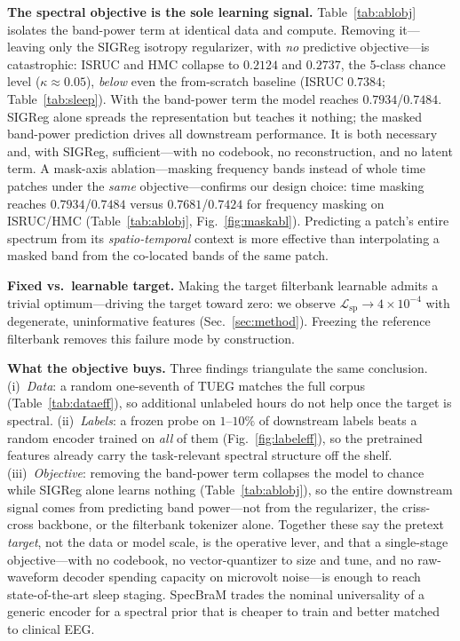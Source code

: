\documentclass[letterpaper]{article} %
\begin{document}
\noindent\textbf{The spectral objective is the sole learning signal.}
Table~\ref{tab:ablobj} isolates the band-power term at identical data and compute.
Removing it---leaving only the SIGReg isotropy regularizer, with \emph{no}
predictive objective---is catastrophic: ISRUC and HMC collapse to $0.2124$ and
$0.2737$, the 5-class chance level ($\kappa{\approx}0.05$), \emph{below} even the
from-scratch baseline (ISRUC $0.7384$; Table~\ref{tab:sleep}). With the band-power
term the model reaches $0.7934$/$0.7484$. SIGReg alone spreads the representation
but teaches it nothing; the masked band-power prediction drives all downstream
performance. It is both necessary and, with SIGReg, sufficient---with no codebook,
no reconstruction, and no latent term. A mask-axis ablation---masking frequency
bands instead of whole time patches under the \emph{same} objective---confirms our
design choice: time masking reaches $0.7934$/$0.7484$ versus $0.7681$/$0.7424$ for
frequency masking on ISRUC/HMC (Table~\ref{tab:ablobj}, Fig.~\ref{fig:maskabl}).
Predicting a patch's entire spectrum from its \emph{spatio-temporal} context is
more effective than interpolating a masked band from the co-located bands of the
same patch.



\noindent\textbf{Fixed vs.\ learnable target.} Making the target filterbank learnable
admits a trivial optimum---driving the target toward zero: we observe
$\mathcal{L}_{\mathrm{sp}}{\to}4{\times}10^{-4}$ with degenerate, uninformative
features (Sec.~\ref{sec:method}). Freezing the reference filterbank removes this
failure mode by construction.

\noindent\textbf{What the objective buys.} Three findings triangulate the same
conclusion. (i)~\emph{Data}: a random one-seventh of TUEG matches the full corpus
(Table~\ref{tab:dataeff}), so additional unlabeled hours do not help once the target
is spectral. (ii)~\emph{Labels}: a frozen probe on $1$--$10\%$ of downstream labels
beats a random encoder trained on \emph{all} of them (Fig.~\ref{fig:labeleff}), so
the pretrained features already carry the task-relevant spectral structure off the
shelf. (iii)~\emph{Objective}: removing the band-power term collapses the model to
chance while SIGReg alone learns nothing (Table~\ref{tab:ablobj}), so the entire
downstream signal comes from predicting band power---not from the regularizer, the
criss-cross backbone, or the filterbank tokenizer alone. Together these say the
pretext \emph{target}, not the data or model scale, is the operative lever, and that
a single-stage objective---with no codebook, no vector-quantizer to size and tune,
and no raw-waveform decoder spending capacity on microvolt noise---is enough to
reach state-of-the-art sleep staging. SpecBraM trades the nominal universality of a
generic encoder for a spectral prior that is cheaper to train and better matched to
clinical EEG.
\end{document}
